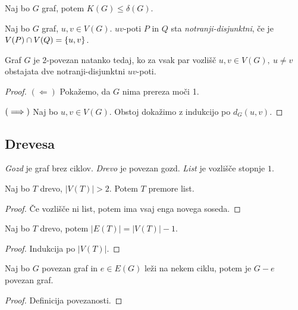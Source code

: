 \begin{opomba}
    Naj bo $G$ graf, potem $K(G) \leq \delta(G)$.
\end{opomba}

\begin{definicija}
    Naj bo $G$ graf, $u,v \in V(G)$. $uv$-poti $P$ in $Q$ sta \emph{notranji-disjunktni}, če je $V(P) \cap V(Q) = \left\{u,v\right\}$.
\end{definicija}

\begin{izrek}[Whitney]
    Graf $G$ je $2$-povezan natanko tedaj, ko za vsak par vozlišč $u, v \in V(G), \ u \neq v$ obstajata dve notranji-disjunktni $uv$-poti.
\end{izrek}

\begin{proof}
    $(\Leftarrow)$ Pokažemo, da $G$ nima prereza moči 1.

    $(\implies)$ Naj bo $u,v \in V(G)$. Obstoj dokažimo z indukcijo po $d_G(u,v)$.
\end{proof}

\subsection{Drevesa}
\begin{definicija}
    \emph{Gozd} je graf brez ciklov. \emph{Drevo} je povezan gozd. \emph{List} je vozlišče stopnje $1$.
\end{definicija}

\begin{lema}
    Naj bo $T$ drevo, $|V(T)| > 2$. Potem $T$ premore list.
\end{lema}

\begin{proof}
    Če vozlišče ni list, potem ima vsaj enga novega soseda.
\end{proof}

\begin{lema}
    Naj bo $T$ drevo, potem $|E(T)| = |V(T)| - 1$.
\end{lema}

\begin{proof}
    Indukcija po $|V(T)|$.
\end{proof}

\begin{lema}
    Naj bo $G$ povezan graf in $e \in E(G)$ leži na nekem ciklu, potem je $G-e$ povezan graf.
\end{lema}

\begin{proof}
    Definicija povezanosti.
\end{proof}

